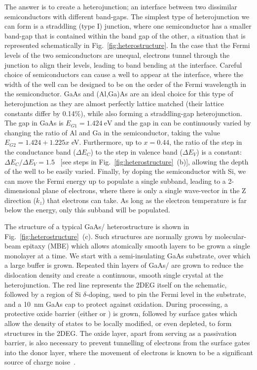 The answer is to create a heterojunction; an interface between two dissimilar semiconductors with different band-gaps.
The simplest type of heterojunction we can form is a straddling (type I) junction, where one semiconductor has a smaller band-gap
that is contained within the band gap of the other, a situation that is represented schematically in Fig.~\ref{fig:heterostructure}.
In the case that the Fermi levels of the two semiconductors are unequal, electrons tunnel through the junction to align
their levels, leading to band bending at the interface. Careful choice of semiconductors can cause a well to appear at the interface,
where the width of the well can be designed to be on the order of the Fermi wavelength in the semiconductor. GaAs and (Al,Ga)As are
an ideal choice for this type of heterojunction as they are almost perfectly lattice matched (their lattice constants differ by 0.14\%),
while also forming a straddling-gap heterojunction. The gap in GaAs is $E_{G1} = \SI{1.424}{\electronvolt}$ and the gap in
 can be continuously varied by
changing the ratio of Al and Ga in the semiconductor, taking the value $E_{G2} = 1.424 + 1.225x$ \si{\electronvolt}.
Furthermore, up to $x = 0.44$, the ratio of the step in the conductance
band ($\Delta E_C$) to the step in valence band ($\Delta E_V$) is a constant: $\Delta E_C/\Delta E_V = 1.5$~\cite{adachi1993properties}
[see steps in Fig.~\ref{fig:heterostructure}~(b)], allowing the depth of the well to be easily varied.
Finally, by doping the semiconductor with Si, we can move the Fermi energy up to populate a single subband, leading to a
2-dimensional plane of electrons, where there is only a single wave-vector in the Z direction ($k_z$) that electrons can take. As long
as the electron temperature is far below the energy, only this subband will be populated.

The structure of a typical GaAs/ heterostructure is shown in Fig.~\ref{fig:heterostructure}~(c). Such structures
are normally grown by molecular-beam epitaxy (MBE) which allows atomically smooth layers to be grown a single monolayer
at a time. We start with a semi-insulating GaAs substrate, over which a large buffer is grown.
Repeated thin layers of GaAs/ are grown to reduce the dislocation density
and create a continuous, smooth single crystal at the heterojunction. The red line represents the 2DEG itself on the schematic,
followed by a region of Si $\delta$-doping, used to pin the Fermi level in the substrate, and
a \SI{10}{\nano\meter} GaAs cap to protect against oxidation. During processing, a protective oxide barrier (either 
or ) is grown, followed by surface gates which allow the density of states to be locally modified, or even depleted,
to form structures in the 2DEG. The oxide layer, apart from serving as a passivation barrier, is also necessary to
prevent tunnelling of electrons from the surface gates into the donor layer, where the movement of electrons is known to be a significant
source of charge noise~\cite{PhysRevB.72.115331, PhysRevApplied.9.034008}.

